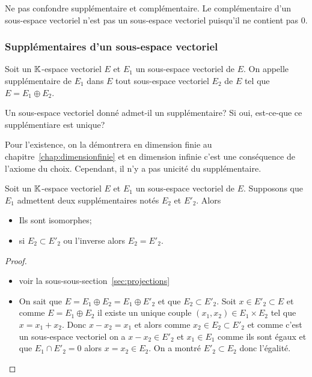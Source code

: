 Ne pas confondre supplémentaire et complémentaire. Le complémentaire d'un sous-espace vectoriel n'est pas un sous-espace vectoriel puisqu'il ne contient pas \(0\).

\subsubsection{Supplémentaires d'un sous-espace vectoriel}

\begin{defdef}
  Soit un \(\mathbb{K}\)-espace vectoriel \(E\) et \(E_1\) un sous-espace vectoriel de \(E\). On appelle supplémentaire de \(E_1\) dans \(E\) tout sous-espace vectoriel \(E_2\) de \(E\) tel que \(E= E_1 \oplus E_2\).
\end{defdef}

Un sous-espace vectoriel donné admet-il un supplémentaire? Si oui, est-ce-que ce supplémentiare est unique?

Pour l'existence, on la démontrera en dimension finie au chapitre~\ref{chap:dimensionfinie} et en dimension infinie c'est une conséquence de l'axiome du choix. Cependant, il n'y a pas unicité du supplémentaire.

\begin{prop}\label{prop:deuxsuppiso}
  Soit un \(\mathbb{K}\)-espace vectoriel \(E\) et \(E_1\) un sous-espace vectoriel de \(E\). Supposons que \(E_1\) admettent deux supplémentaires notés \(E_2\) et \(E'_2\). Alors
  \begin{itemize}
  \item Ils sont isomorphes;
  \item si \(E_2 \subset E'_2\) ou l'inverse alors \(E_2=E'_2\).
  \end{itemize}
\end{prop}
\begin{proof}
  \begin{itemize}
  \item voir la sous-sous-section~\ref{sec:projections}
  \item On sait que \(E=E_1 \oplus E_2=E_1 \oplus E'_2\) et que \(E_2 \subset E'_2\). Soit \(x \in E'_2 \subset E\) et comme \(E=E_1 \oplus E_2\) il existe un unique couple \((x_1,x_2 ) \in E_1 \times E_2\) tel que \(x=x_1+x_2\). Donc \(x-x_2=x_1\) et alors comme \(x_2 \in E_2 \subset E'_2\) et comme c'est un sous-espace vectoriel on a \(x-x_2\in E'_2\)  et \(x_1 \in E_1\) comme ils sont égaux et que \(E_1 \cap E'_2=0\)  alors \(x=x_2 \in E_2\). On a montré \(E'_2 \subset E_2\) donc l'égalité.
  \end{itemize}
\end{proof}

